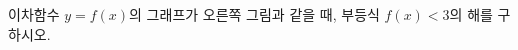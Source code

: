 \hspace*{2mm}\begin{minipage}[t]{\dimexpr\linewidth-2mm\relax}\vspace{0pt}
\noindent\begin{minipage}[t]{0.58\linewidth}\vspace{0pt}\raggedright 이차함수 $y=f(x)$의 그래프가 오른쪽 그림과 같을 때, 부등식 $f(x)<3$의 해를 구하시오.\end{minipage}\hfill\begin{minipage}[t]{0.4\linewidth}\vspace{0pt}\centering \resizebox{\ifdim\width>\linewidth\linewidth\else\width\fi}{!}{}\end{minipage}\par\end{minipage}
